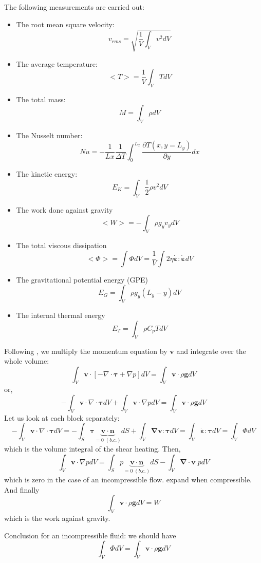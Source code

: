 The following measurements are carried out:
\begin{itemize}
\item The root mean square velocity:
\[
v_{rms} = \sqrt{\frac{1}{V}\int_V v^2 dV   }
\]
\item The average temperature:
\[
<T>=\frac{1}{V}\int_V T dV
\]
\item The total mass:
\[
M=\int_V \rho dV
\]
\item The Nusselt number:
\[
Nu=-\frac{1}{Lx}\frac{1}{\Delta T} \int_0^{L_x} \frac{\partial T(x,y=L_y)}{\partial y} dx
\]
\item The kinetic energy:
\[
E_K=\int_V \frac{1}{2}\rho v^2 dV
\]
\item The work done against gravity
\[
<W>=-\int_V \rho g_y v_y dV
\]
\item The total viscous dissipation
\[
<\Phi>=\int \Phi dV =\frac{1}{V}\int 2 \eta \dot{\bm \varepsilon}:\dot{\bm \varepsilon} dV 
\]
\item The gravitational potential energy (GPE)
\[
E_G = \int_V \rho g_y (L_y-y) dV
\]
\item The internal thermal energy
\[
E_T = \int_V \rho C_p T dV
\]


\end{itemize}

\newpage

Following \cite{lezh08}, we multiply the momentum equation by ${\bm v}$ and integrate over the whole volume:
\[
\int_V {\bm v} \cdot \left[ -\nabla \cdot {\bm \tau}  + \nabla p \right] dV  = \int_V {\bm v} \cdot \rho {\bm g} dV
\]
or, 
\[
-\int_V {\bm v} \cdot \nabla \cdot {\bm \tau} dV +\int_V {\bm v} \cdot  \nabla p dV  = \int_V {\bm v} \cdot \rho {\bm g} dV
\]
Let us look at each block separately:
\[
-\int_V {\bm v} \cdot \nabla \cdot {\bm \tau} dV  
=-\int_S  {\bm \tau} \underbrace{{\bm v}\cdot {\bm n}}_{=0 \; (b.c.)} dS + \int_V {\bm \nabla}{\bm v} : {\bm \tau} dV 
= \int_V \dot{\bm \varepsilon} : {\bm \tau} dV 
= \int_V \Phi  dV 
\]
which is the volume integral of the shear heating. Then,
\[
\int_V {\bm v} \cdot  \nabla p dV  =
\int_S p \underbrace{{\bm v}\cdot {\bm n}}_{=0 \; (b.c.)} dS - \int_V {\bm \nabla}\cdot{\bm v} \; p dV  
\]
which is zero in the case of an incompressible flow. {\color{red} expand when compressible}.
And finally
\[
\int_V {\bm v} \cdot \rho {\bm g} dV = W
\]
which is the work against gravity.  

Conclusion for an incompressible fluid: we should have
\[
\int_V \Phi  dV 
=
\int_V {\bm v} \cdot \rho {\bm g} dV 
\]

